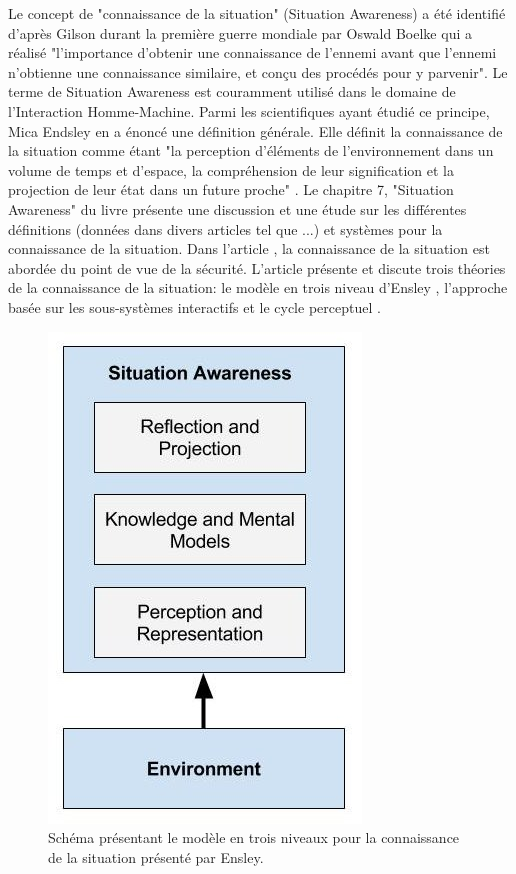 \documentclass[a4paper,11pt,twoside]{StyleThese}
\begin{document}
Le concept de "connaissance de la situation" (Situation Awareness) a été identifié d'après Gilson \cite{gilson1995} durant la première guerre mondiale par Oswald Boelke qui a réalisé "l'importance d'obtenir une connaissance de l'ennemi avant que l'ennemi n'obtienne une connaissance similaire, et conçu des procédés pour y parvenir". Le terme de Situation Awareness est couramment utilisé dans le domaine de l'Interaction Homme-Machine. Parmi les scientifiques ayant étudié ce principe, Mica Endsley en a énoncé une définition générale. Elle définit la connaissance de la situation comme étant "la perception d'éléments de l'environnement dans un volume de temps et d'espace, la compréhension de leur signification et la projection de leur état dans un future proche" \cite{endsley2000}.
Le chapitre 7, "Situation Awareness" du livre \cite{pew1998modeling} présente une discussion et une étude sur les différentes définitions (données dans divers articles tel que \cite{stiffler1988graduate,noble1989application,fracker1988theory}...) et systèmes pour la connaissance de la situation. Dans l'article \cite{stanton2001situational}, la connaissance de la situation est abordée du point de vue de la sécurité. L'article présente et discute trois théories de la connaissance de la situation: le modèle en trois niveau d'Ensley \cite{endsley1995}, l'approche basée sur les sous-systèmes interactifs \cite{bedny1999theory} et le cycle perceptuel  \cite{smith1995situation}.

\begin{figure}[ht!]
 \centering
  \includegraphics[width=0.49\linewidth]{./img/ensley.jpg} 
  \caption {Schéma présentant le modèle en trois niveaux pour la connaissance de la situation présenté par Ensley.}
  \label{fig:ensley}
\end{figure}
\end{document}
